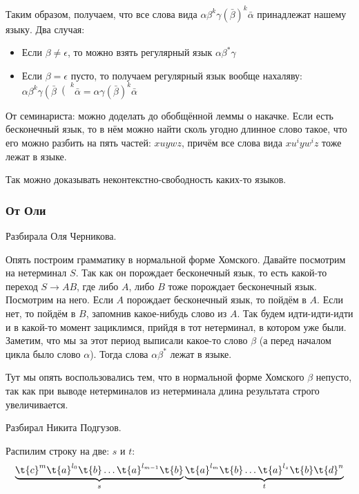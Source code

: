 		Таким образом, получаем, что все слова вида $\alpha \beta^k \gamma \left(\bar\beta\right)^k \bar\alpha$ принадлежат нашему языку.
		Два случая:
		\begin{itemize}
			\item Если $\beta \neq \epsilon$, то можно взять регулярный язык $\alpha\beta^*\gamma$
			\item Если $\beta = \epsilon$ пусто, то получаем регулярный язык вообще нахаляву: $\alpha \beta^k \gamma \left(\bar\beta\right(^k \bar\alpha = \alpha \gamma \left(\bar\beta\right)^k \bar \alpha$
		\end{itemize}

		\begin{Rem}
			От семинариста: можно доделать до обобщённой леммы о накачке.
			Если есть бесконечный язык, то в нём можно найти сколь угодно длинное слово такое,
			что его можно разбить на пять частей: $xuywz$, причём все слова вида
			$xu^iyw^iz$ тоже лежат в языке.

			Так можно доказывать неконтекстно-свободность каких-то языков.
		\end{Rem}

	\subsubsection{От Оли}
		Разбирала Оля Черникова.

		Опять построим грамматику в нормальной форме Хомского.
		Давайте посмотрим на нетерминал $S$.
		Так как он порождает бесконечный язык, то есть какой-то переход $S \to AB$,
		где либо $A$, либо $B$ тоже порождает бесконечный язык.
		Посмотрим на него.
		Если $A$ порождает бесконечный язык, то пойдём в $A$.
		Если нет, то пойдём в $B$, запомнив какое-нибудь слово из $A$.
		Так будем идти-идти-идти и в какой-то момент зациклимся, прийдя в тот нетерминал, в котором уже были.
		Заметим, что мы за этот период выписали какое-то слово $\beta$ (а перед началом цикла было слово $\alpha$).
		Тогда слова $\alpha\beta^*$ лежат в языке.
		\begin{Rem}
			Тут мы опять воспользовались тем, что в нормальной форме Хомского $\beta$ непусто,
			так как при выводе нетерминалов из нетерминала длина результата строго увеличивается.
		\end{Rem}

	Разбирал Никита Подгузов.

	Распилим строку на две: $s$ и $t$:
	\[
		\underbrace{\t{c}^m \t{a}^{l_0} \t{b} \dots \t{a}^{l_{m-1}} \t{b}}_{s} \underbrace{\t{a}^{l_m}\t{b} \dots \t{a}^{l_z} \t{b} \t{d}^n}_{t}
	\]

